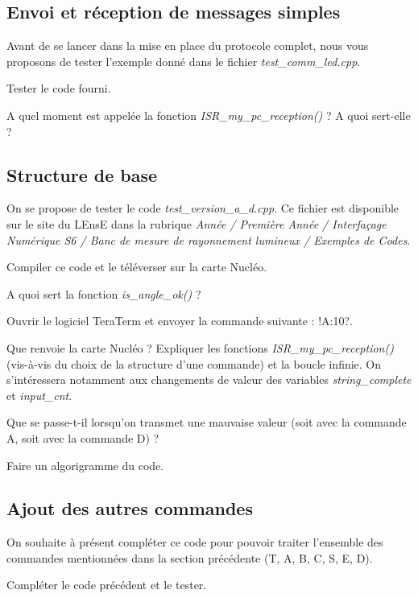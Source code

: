 \documentclass[a4paper,11pt,titlepage]{article} %
\begin{document}
\subsection{Envoi et réception de messages simples}

Avant de se lancer dans la mise en place du protocole complet, nous vous proposons de tester l'exemple donné dans le fichier \textsl{test\_comm\_led.cpp}.

\Manip Tester le code fourni. 

\Quest A quel moment est appelée la fonction \textsl{ISR\_my\_pc\_reception()} ? A quoi sert-elle ?


\subsection{Structure de base}

On se propose de tester le code \textsl{test\_version\_a\_d.cpp}. Ce fichier est disponible sur le site du LEnsE dans la rubrique \textit{Année / Première Année / Interfaçage Numérique S6 / Banc de mesure de rayonnement lumineux / Exemples de Codes}.

\Manip Compiler ce code et le téléverser sur la carte Nucléo.

\Quest A quoi sert la fonction \textsl{is\_angle\_ok()} ?

\Manip Ouvrir le logiciel TeraTerm et envoyer la commande suivante : \textsc{!A:10?}.

\Quest Que renvoie la carte Nucléo ? Expliquer les fonctions \textsl{ISR\_my\_pc\_reception()} (vis-à-vis du choix de la structure d'une commande) et la boucle infinie. On s'intéressera notamment aux changements de valeur des variables \textsl{string\_complete} et \textsl{input\_cnt}.

\Quest Que se passe-t-il lorsqu'on transmet une mauvaise valeur (soit avec la commande A, soit avec la commande D) ?

\Quest Faire un algorigramme du code.

\subsection{Ajout des autres commandes}

On souhaite à présent compléter ce code pour pouvoir traiter l'ensemble des commandes mentionnées dans la section précédente (T, A, B, C, S, E, D).

\Manip Compléter le code précédent et le tester.
\end{document}
